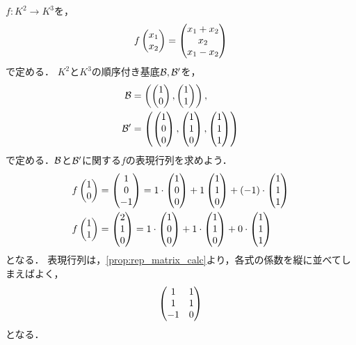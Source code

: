 \begin{example}
    $f \colon K^2 \to K^3$を，
    \[
        f\pmt{x_1 \\ x_2} = \pmt{x_1 + x_2 \\ x_2 \\ x_1 - x_2}
    \]
    で定める．
    $K^2$と$K^3$の順序付き基底$\calB,\calB'$を，
    \[
        \begin{aligned}
            \calB &= \left(\pmt{1 \\ 0}, \pmt{1 \\ 1}\right), \\
            \calB' &= \left(\pmt{1 \\ 0 \\ 0}, \pmt{1 \\ 1 \\ 0} , \pmt{1 \\ 1 \\ 1} \right)
        \end{aligned}
    \]
    で定める．$\calB$と$\calB'$に関する$f$の表現行列を求めよう．
    \[
        \begin{aligned}
            f\pmt{1 \\ 0} &= \pmt{ 1 \\ 0 \\ -1} = 1 \cdot \pmt{1 \\ 0 \\ 0 } + 1 \pmt{1 \\ 1 \\ 0} + (-1)\cdot \pmt{1 \\ 1 \\ 1} \\
            f\pmt{1 \\ 1} &= \pmt{ 2 \\ 1 \\ 0} = 1 \cdot \pmt{1 \\ 0 \\ 0 } + 1 \cdot \pmt{1 \\ 1 \\ 0} + 0 \cdot \pmt{1 \\ 1 \\ 1}
        \end{aligned}
    \]
    となる．
    表現行列は，\cref{prop:rep_matrix_calc}より，各式の係数を縦に並べてしまえばよく，
    \[
        \pmt{1 & 1\\ 1 & 1 \\ -1 & 0 }
    \]
    となる．
\end{example}
